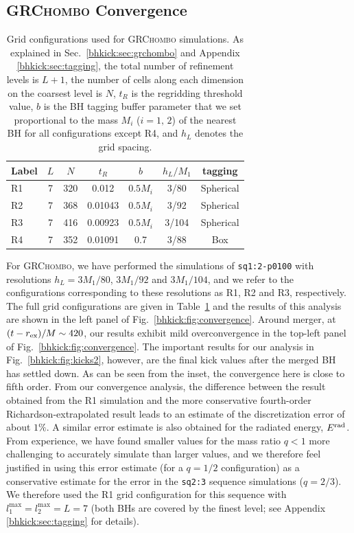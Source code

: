 \subsection{\textsc{GRChombo} Convergence}
\begin{table}[b]  
    \caption{Grid configurations used for \textsc{GRChombo} simulations.
    As explained in Sec.~\ref{bhkick:sec:grchombo} and Appendix \ref{bhkick:sec:tagging},
    the total 
    number of refinement levels is $L+1$, the number of cells along each
    dimension on the coarsest level is $N$, $t_R$ is the regridding 
    threshold value, $b$ is the BH tagging buffer parameter
    that we
    set proportional to the mass $M_i$ ($i=1,\,2$)
    of the nearest BH for all configurations except R4, 
    and $h_L$ denotes the grid spacing.
    }
    \centering
    \begin{tabular}{lcccccc}\hline
        Label & $L$ & $N$ & $t_R$ & $b$ & $h_L/M_1$ & tagging\\
        \hline
        R1 & 7 & 320 & 0.012 & $0.5M_i$ & 3/80 & Spherical \\
        R2 & 7 & 368 & 0.01043 & $0.5M_i$ & 3/92 & Spherical\\
        R3 & 7 & 416 & 0.00923 & $0.5M_i$ & 3/104 & Spherical\\
        R4 & 7 & 352 & 0.01091 & 0.7 & 3/88 & Box\\\hline
    \end{tabular}
    \label{bhkick:tab:grchombo-grids}
\end{table}
For \textsc{GRChombo}, we have performed the simulations of 
\texttt{sq1:2-p0100} with resolutions $h_L=3M_1/80$, $3M_1/92$ and 
$3M_1/104$, and we refer to the configurations corresponding to these 
resolutions as R1, R2 and R3, respectively.
The full grid configurations 
are given in Table~\ref{bhkick:tab:grchombo-grids} and the results of this 
analysis are shown in the left panel of Fig.~\ref{bhkick:fig:convergence}. Around
merger, at $(t-r_{\rm ex})/M\sim 420$, our results exhibit mild
overconvergence
in the top-left panel of Fig.~\ref{bhkick:fig:convergence}.
The important results for our analysis in Fig.~\ref{bhkick:fig:kicks2},
however, are the final kick values after the merged BH has settled down.
As can be seen from the inset, the convergence here is close to 
fifth order. 
From our convergence 
analysis, the difference between the result obtained from the R1 simulation 
and the more conservative fourth-order Richardson-extrapolated result leads 
to an estimate of the discretization error of about $1\%$. A similar error 
estimate is also obtained for the radiated energy, $E^{\mathrm{rad}}$.
From experience, we have found smaller values for the mass ratio $q<1$ 
more challenging to accurately simulate than larger values, and we 
therefore feel justified in using this error estimate (for a $q=1/2$ 
configuration) as a conservative estimate for the error in the 
\texttt{sq2:3} sequence simulations ($q=2/3$). We therefore used the R1 grid
configuration for this sequence with  $l_1^{\max}=l_2^{\max}=L=7$ 
(both BHs are covered by 
the finest level; see Appendix \ref{bhkick:sec:tagging} for details).

